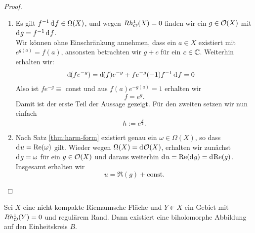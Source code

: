 \begin{proof}
  \begin{enumerate}
  \item Es gilt $f^{-1}\d[f] \in \Omega(X)$, und wegen $Rh^1_{\mathcal{O}}(X) = 0$
    finden wir ein $g \in \mathcal{O}(X)$ mit $\d[g] = f^{-1} \d[f]$.\\
    Wir können ohne Einschränkung annehmen, dass ein $a \in X$ existiert mit $ e^{g(a)} =
    f(a)$, ansonsten betrachten wir $g + c$ für ein $c \in \mathbb{C}$. Weiterhin erhalten wir:
    \begin{align*}
      \d[(f e^{-g})] & = \d[(f)] e^{-g} + f e^{-g} (-1) f^{-1}\d[f] = 0
    \end{align*}
    Also ist $fe^{-g} \equiv $ const und aus $f(a) e^{-g(a)} = 1$
    erhalten wir
    \[
    f = e^g.
    \]
    Damit ist der erste Teil der Aussage gezeigt. Für den zweiten
    setzen wir nun einfach
    \[
    h := e^{\frac{g}{2}}.
    \]
  \item Nach Satz \ref{thm:harm-form} existiert genau ein $\omega \in \Omega(X)$, so dass $\d[u]
    = \Re(\omega)$
    gilt. Wieder wegen $\Omega(X) = \d[\hol(X)]$,
    erhalten wir zunächst $\d[g] = \omega$ für ein $g \in \mathcal{O}(X)$ und
    daraus weiterhin $\d[u] = \Re(\d[g])= \d[\Re(g)]$. Insgesamt erhalten wir
    \[
    u = \Re(g) + \text{const.}
    \]
  \end{enumerate}
\end{proof}

\begin{thm}
  \label{thm:Gebiet-Kreis}
  Sei $X$ eine nicht kompakte Riemannsche Fläche und $Y \Subset X$ ein
  Gebiet mit $Rh^1_{\mathcal{O}}(Y) = 0$ und regulärem Rand.
  Dann existiert eine biholomorphe Abbildung auf den Einheitskreis $B$.
\end{thm}

